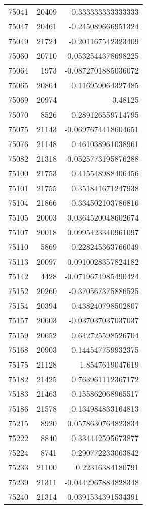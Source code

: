 \begin{tabular}{r | r | r}
75041 & 20409 & 0.333333333333333 \\
75047 & 20461 & -0.245089666951324 \\
75049 & 21724 & -0.201167542323409 \\
75060 & 20710 & 0.0532544378698225 \\
75064 & 1973 & -0.0872701885036072 \\
75065 & 20864 & 0.116959064327485 \\
75069 & 20974 & -0.48125 \\
75070 & 8526 & 0.289126559714795 \\
75075 & 21143 & -0.0697674418604651 \\
75076 & 21148 & 0.461038961038961 \\
75082 & 21318 & -0.0525773195876288 \\
75100 & 21753 & 0.415548988406456 \\
75101 & 21755 & 0.351841671247938 \\
75104 & 21866 & 0.334502103786816 \\
75105 & 20003 & -0.0364520048602674 \\
75107 & 20018 & 0.0995423340961097 \\
75110 & 5869 & 0.228245363766049 \\
75113 & 20097 & -0.0910028357824182 \\
75142 & 4428 & -0.0719674985490424 \\
75152 & 20260 & -0.370567375886525 \\
75154 & 20394 & 0.438240798502807 \\
75157 & 20603 & -0.037037037037037 \\
75159 & 20652 & 0.642725598526704 \\
75168 & 20903 & 0.144547759932375 \\
75175 & 21128 & 1.8547619047619 \\
75182 & 21425 & 0.763961112367172 \\
75183 & 21463 & 0.155862068965517 \\
75186 & 21578 & -0.134984833164813 \\
75215 & 8920 & 0.0578630764823834 \\
75222 & 8840 & 0.334442595673877 \\
75224 & 8741 & 0.290772233063842 \\
75233 & 21100 & 0.22316384180791 \\
75239 & 21311 & -0.0442967884828348 \\
75240 & 21314 & -0.0391534391534391 \\

\end{tabular}
